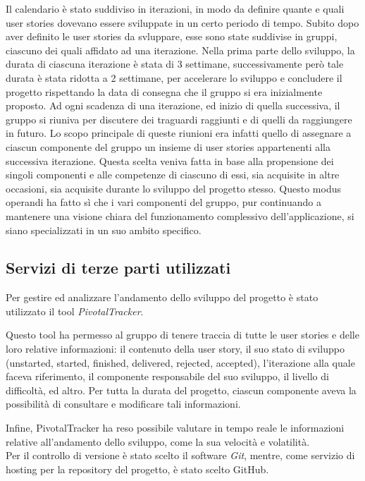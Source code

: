 Il calendario è stato suddiviso in iterazioni, in modo da definire
quante e quali user stories dovevano essere sviluppate in un certo
periodo di tempo. Subito dopo aver definito le user stories da
svluppare, esse sono state suddivise in gruppi, ciascuno dei quali affidato ad
una iterazione. Nella prima parte dello sviluppo, la durata di
ciascuna iterazione è stata di 3 settimane, successivamente però tale
durata è stata ridotta a 2 settimane, per accelerare lo sviluppo e
concludere il progetto rispettando la data di consegna che il gruppo
si era inizialmente proposto.  Ad ogni scadenza di una iterazione, ed
inizio di quella successiva, il gruppo si riuniva per discutere dei
traguardi raggiunti e di quelli da raggiungere in futuro. Lo scopo
principale di queste riunioni era infatti quello di assegnare a
ciascun componente del gruppo un insieme di user stories appartenenti
alla successiva iterazione.  Questa scelta veniva fatta in base alla
propensione dei singoli componenti e alle competenze di ciascuno di
essi, sia acquisite in altre occasioni, sia acquisite durante lo
sviluppo del progetto stesso. Questo modus operandi ha fatto sì che i
vari componenti del gruppo, pur continuando a mantenere una visione
chiara del funzionamento complessivo dell'applicazione, si siano
specializzati in un suo ambito specifico.

\subsection{Servizi di terze parti utilizzati}

Per gestire ed analizzare l'andamento dello sviluppo del progetto è
stato utilizzato il tool \textit{PivotalTracker}.

Questo tool ha permesso al gruppo di tenere traccia di tutte le user
stories e delle loro relative informazioni: il contenuto della user
story, il suo stato di sviluppo (unstarted, started, finished, delivered,
rejected, accepted), l'iterazione alla quale faceva riferimento, il
componente responsabile del suo sviluppo, il livello di difficoltà, ed
altro. Per tutta la durata del progetto, ciascun componente aveva la
possibilità di consultare e modificare tali informazioni.

Infine, PivotalTracker ha reso possibile valutare in tempo
reale le informazioni relative all'andamento dello sviluppo, come la
sua velocità e volatilità.\\

Per il controllo di versione è stato scelto il software \textit{Git},
mentre, come servizio di hosting per la repository del progetto, è
stato scelto GitHub.

